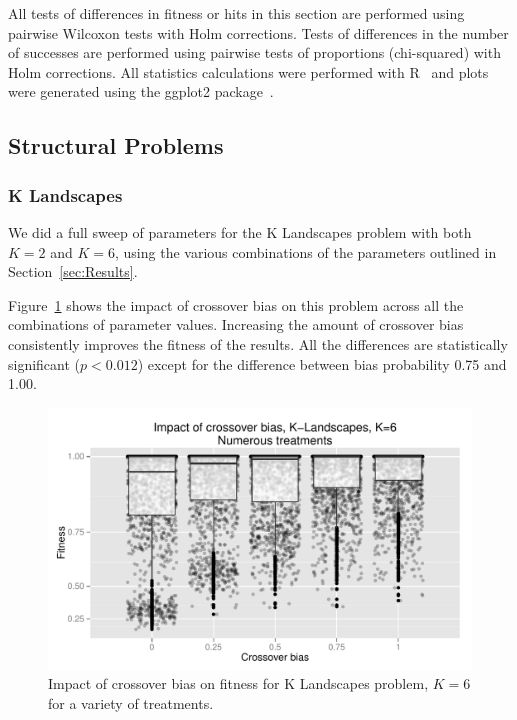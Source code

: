 \documentclass{sig-alternate}
\begin{document}
All tests of differences in fitness or hits in this section are performed using 
pairwise Wilcoxon tests with Holm corrections. Tests of differences in the number of successes are
performed using pairwise tests of proportions (chi-squared) with Holm corrections.
All statistics calculations were performed with R~\cite{R} 
and plots were generated using the ggplot2 package~\cite{ggplot2Book}.

\subsection{Structural Problems}

\subsubsection{K Landscapes}

We did a full sweep of parameters for the K Landscapes problem with both $K=2$ and $K=6$, using the various combinations
of the parameters outlined in Section~\ref{sec:Results}.

Figure~\ref{fig:KLandscapes6_results} shows the impact of crossover bias on this problem across all the combinations of
parameter values. Increasing the amount of crossover bias consistently improves the fitness of the results. All the
differences are statistically significant ($p < 0.012$) except for the difference between bias probability 0.75 and
1.00.

%
%
%
%

\begin{figure}
\centering
\includegraphics[width=0.45 \textwidth]{Plots/KLandscapes6_XO_bias_impact_transformed_boxplot_alpha075.pdf}
\caption{Impact of crossover bias on fitness for K Landscapes problem, $K=6$ for a variety of treatments.}
\label{fig:KLandscapes6_results}
\end{figure}
\end{document}
